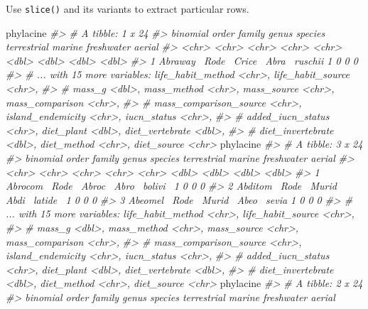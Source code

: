 \documentclass[]{book}
\newenvironment{Shaded}{}{}
\newcommand{\CommentTok}[1]{\textcolor[rgb]{0.38,0.63,0.69}{\textit{#1}}}
\newcommand{\DecValTok}[1]{\textcolor[rgb]{0.25,0.63,0.44}{#1}}
\newcommand{\KeywordTok}[1]{\textcolor[rgb]{0.00,0.44,0.13}{\textbf{#1}}}
\newcommand{\NormalTok}[1]{#1}
\newcommand{\OperatorTok}[1]{\textcolor[rgb]{0.40,0.40,0.40}{#1}}
\newcommand{\StringTok}[1]{\textcolor[rgb]{0.25,0.44,0.63}{#1}}
\begin{document}
Use \texttt{slice()} and its variants to extract particular rows.

\begin{Shaded}
\begin{Highlighting}[]
\NormalTok{phylacine }\OperatorTok{%
\CommentTok{#> # A tibble: 1 x 24}
\CommentTok{#>   binomial order family genus species terrestrial marine freshwater aerial}
\CommentTok{#>   <chr>    <chr> <chr>  <chr> <chr>         <dbl>  <dbl>      <dbl>  <dbl>}
\CommentTok{#> 1 Abraway~ Rode~ Crice~ Abra~ ruschii           1      0          0      0}
\CommentTok{#> # ... with 15 more variables: life_habit_method <chr>, life_habit_source <chr>,}
\CommentTok{#> #   mass_g <dbl>, mass_method <chr>, mass_source <chr>, mass_comparison <chr>,}
\CommentTok{#> #   mass_comparison_source <chr>, island_endemicity <chr>, iucn_status <chr>,}
\CommentTok{#> #   added_iucn_status <chr>, diet_plant <dbl>, diet_vertebrate <dbl>,}
\CommentTok{#> #   diet_invertebrate <dbl>, diet_method <chr>, diet_source <chr>}
\NormalTok{phylacine }\OperatorTok{%
\CommentTok{#> # A tibble: 3 x 24}
\CommentTok{#>   binomial order family genus species terrestrial marine freshwater aerial}
\CommentTok{#>   <chr>    <chr> <chr>  <chr> <chr>         <dbl>  <dbl>      <dbl>  <dbl>}
\CommentTok{#> 1 Abrocom~ Rode~ Abroc~ Abro~ bolivi~           1      0          0      0}
\CommentTok{#> 2 Abditom~ Rode~ Murid~ Abdi~ latide~           1      0          0      0}
\CommentTok{#> 3 Abeomel~ Rode~ Murid~ Abeo~ sevia             1      0          0      0}
\CommentTok{#> # ... with 15 more variables: life_habit_method <chr>, life_habit_source <chr>,}
\CommentTok{#> #   mass_g <dbl>, mass_method <chr>, mass_source <chr>, mass_comparison <chr>,}
\CommentTok{#> #   mass_comparison_source <chr>, island_endemicity <chr>, iucn_status <chr>,}
\CommentTok{#> #   added_iucn_status <chr>, diet_plant <dbl>, diet_vertebrate <dbl>,}
\CommentTok{#> #   diet_invertebrate <dbl>, diet_method <chr>, diet_source <chr>}
\NormalTok{phylacine }\OperatorTok{%
\CommentTok{#> # A tibble: 2 x 24}
\CommentTok{#>   binomial order family genus species terrestrial marine freshwater aerial}
}}}
\end{Highlighting}
\end{Shaded}
\end{document}
